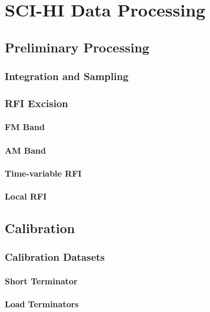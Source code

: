 \chapter{SCI-HI Data Processing}\label{Ch:Data}

\section{Preliminary Processing}

\subsection{Integration and Sampling}

\subsection{RFI Excision}

\subsubsection{FM Band}

\subsubsection{AM Band}

\subsubsection{Time-variable RFI}

\subsubsection{Local RFI}

\section{Calibration}

\subsection{Calibration Datasets}

\subsubsection{Short Terminator}

\subsubsection{Load Terminators}

